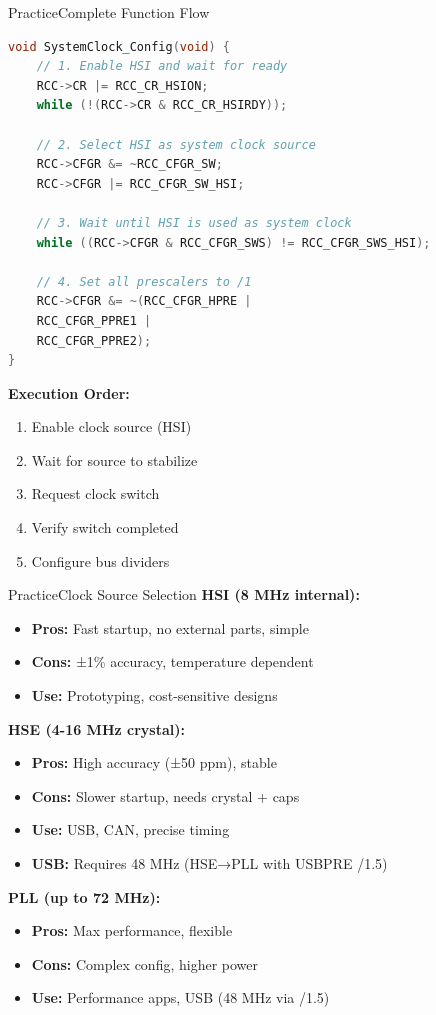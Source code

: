 \documentclass{beamer}
\begin{document}
\begin{frame}[fragile]{Practice}{Complete Function Flow}
	\begin{lstlisting}[language=C, basicstyle=\ttfamily\tiny]
void SystemClock_Config(void) {
	// 1. Enable HSI and wait for ready
	RCC->CR |= RCC_CR_HSION;
	while (!(RCC->CR & RCC_CR_HSIRDY));
			
	// 2. Select HSI as system clock source
	RCC->CFGR &= ~RCC_CFGR_SW;
	RCC->CFGR |= RCC_CFGR_SW_HSI;
			
	// 3. Wait until HSI is used as system clock
	while ((RCC->CFGR & RCC_CFGR_SWS) != RCC_CFGR_SWS_HSI);
			
	// 4. Set all prescalers to /1
	RCC->CFGR &= ~(RCC_CFGR_HPRE | 
	RCC_CFGR_PPRE1 | 
	RCC_CFGR_PPRE2);
}
	\end{lstlisting}
	
	\medskip
	\textbf{Execution Order:}
	\begin{enumerate}
		\item Enable clock source (HSI)
		\item Wait for source to stabilize
		\item Request clock switch
		\item Verify switch completed
		\item Configure bus dividers
	\end{enumerate}
\end{frame}

\begin{frame}{Practice}{Clock Source Selection}
	\textbf{HSI (8 MHz internal):}
	\begin{itemize}
		\item \textbf{Pros:} Fast startup, no external parts, simple
		\item \textbf{Cons:} ±1\% accuracy, temperature dependent
		\item \textbf{Use:} Prototyping, cost-sensitive designs
	\end{itemize}
	
	\medskip
	\textbf{HSE (4-16 MHz crystal):}
	\begin{itemize}
		\item \textbf{Pros:} High accuracy (±50 ppm), stable
		\item \textbf{Cons:} Slower startup, needs crystal + caps
		\item \textbf{Use:} USB, CAN, precise timing
		\item \textbf{USB:} Requires 48 MHz (HSE→PLL with USBPRE /1.5)
	\end{itemize}
	
	\medskip
	\textbf{PLL (up to 72 MHz):}
	\begin{itemize}
		\item \textbf{Pros:} Max performance, flexible
		\item \textbf{Cons:} Complex config, higher power
		\item \textbf{Use:} Performance apps, USB (48 MHz via /1.5)
	\end{itemize}
\end{frame}
\end{document}
